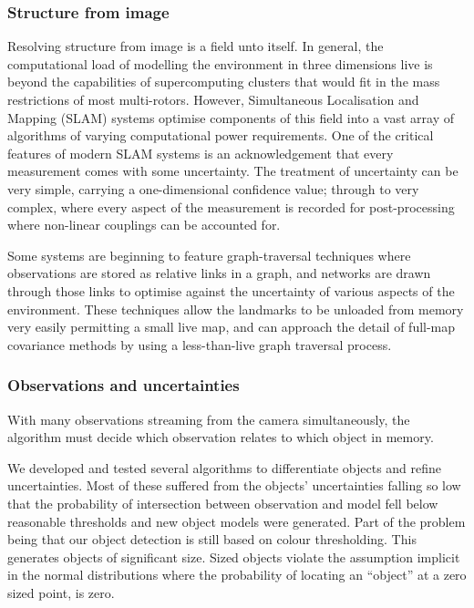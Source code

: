 \documentclass{article}
\newcounter{subsubsubsection}[subsubsection]
\begin{document}
    \subsubsection{Structure from image}
      Resolving structure from image is a field unto itself.  In general, the computational load of modelling the environment in three dimensions live is beyond the capabilities of supercomputing clusters that would fit in the mass restrictions of most multi-rotors.  However, Simultaneous Localisation and Mapping (SLAM) systems optimise components of this field into a vast array of algorithms of varying computational power requirements.
      One of the critical features of modern SLAM systems is an acknowledgement that every measurement comes with some uncertainty. 
      The treatment of uncertainty can be very simple, carrying a one-dimensional confidence value; through to very complex, where every aspect of the measurement is recorded for post-processing where non-linear couplings can be accounted for.

      Some systems are beginning to feature graph-traversal techniques where observations are stored as relative links in a graph, and networks are drawn through those links to optimise against the uncertainty of various aspects of the environment.  These techniques allow the landmarks to be unloaded from memory very easily permitting a small live map, and can approach the detail of full-map covariance methods by using a less-than-live graph traversal process.

    \subsubsection{Observations and uncertainties}

        \label{sec:objectAllocation}
        With many observations streaming from the camera simultaneously, the algorithm must decide which observation relates to which object in memory.

        We developed and tested several algorithms to differentiate objects and refine uncertainties.
        Most of these suffered from the objects' uncertainties falling so low that the probability of intersection between observation and model fell below reasonable thresholds and new object models were generated.  Part of the problem being that our object detection is still based on colour thresholding.  This generates objects of significant size.  Sized objects violate the assumption implicit in the normal distributions where the probability of locating an ``object'' at a zero sized point, is zero.
\end{document}
